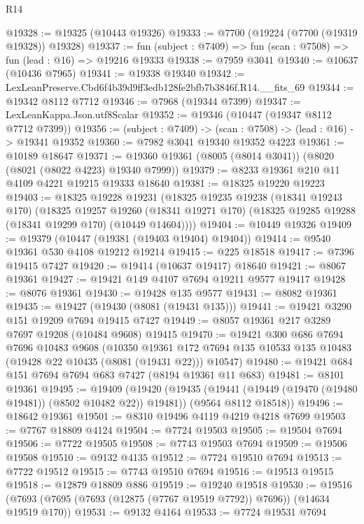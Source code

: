 \begin{lexlean}{R14}
\begin{coremodule}
@19328 := @19325 (@10443 @19326)
@19333 := @7700 (@19224 (@7700 (@19319 @19328)) @19328)
@19337 := fun (subject : @7409) => fun (scan : @7508) => fun (lead : @16) => @19216 @19333
@19338 := @7959 @3041
@19340 := @10637 (@10436 @7965)
@19341 := @19338 @19340
@19342 := LexLeanPreserve.Cbd6f4b39d9ff3edb128fe2bfb7b3846f.R14.__fits_69
@19344 := @19342 @8112 @7712
@19346 := @7968 (@19344 @7399)
@19347 := LexLeanKappa.Json.utf8Scalar
@19352 := @19346 (@10447 (@19347 @8112 @7712 @7399))
@19356 := (subject : @7409) -> (scan : @7508) -> (lead : @16) -> @19341 @19352
@19360 := @7982 @3041 @19340 @19352 @4223
@19361 := @10189 @18647
@19371 := @19360 @19361 (@8005 (@8014 @3041)) (@8020 (@8021 (@8022 @4223) @19340 @7999))
@19379 := @8233 @19361 @210 @11 @4109 @4221 @19215 @19333 @18640
@19381 := @18325 @19220 @19223
@19403 := @18325
    @19228
    @19231
    (@18325
      @19235
      @19238
      (@18341 @19243 @170)
      (@18325
        @19257
        @19260
        (@18341 @19271 @170)
        (@18325 @19285 @19288 (@18341 @19299 @170) (@10449 @14604))))
@19404 := @10449 @19326
@19409 := @19379 (@10447 (@19381 (@19403 @19404) @19404))
@19414 := @9540 @19361 @530 @4108 @19212 @19214
@19415 := @225 @18518
@19417 := @7396 @19415 @7427
@19420 := @19414 (@10637 @19417) @18640
@19421 := @8067 @19361
@19427 := @19421 @149 @4107 @7694 @19211 @9577 @19417
@19428 := @8076 @19361
@19430 := @19428 @135 @9577
@19431 := @8082 @19361
@19435 := @19427 (@19430 (@8081 (@19431 @135)))
@19441 := @19421 @3290 @151 @19209 @7694 @19415 @7427
@19449 := @8057 @19361 @217 @3289 @7697 @19208 (@10484 @9608) @19415
@19470 := @19421
    @300
    @686
    @7694
    @7696
    @10483
    @9608
    (@10350
      @19361
      @172
      @7694
      @135
      @10533
      @135
      @10483
      (@19428 @22 @10435 (@8081 (@19431 @22)))
      @10547)
@19480 := @19421 @684 @151 @7694 @7694 @683 @7427 (@8194 @19361 @11 @683)
@19481 := @8101 @19361
@19495 := @19409
    (@19420
      (@19435 (@19441 (@19449 (@19470 (@19480 @19481)) (@8502 @10482 @22)) @19481))
      (@9564 @8112 @18518))
@19496 := @18642 @19361
@19501 := @8310 @19496 @4119 @4219 @4218 @7699
@19503 := @7767 @18809 @4124
@19504 := @7724 @19503
@19505 := @19504 @7694
@19506 := @7722 @19505
@19508 := @7743 @19503 @7694
@19509 := @19506 @19508
@19510 := @9132 @4135
@19512 := @7724 @19510 @7694
@19513 := @7722 @19512
@19515 := @7743 @19510 @7694
@19516 := @19513 @19515
@19518 := @12879 @18809 @886
@19519 := @19240 @19518
@19530 := @19516 (@7693 (@7695 (@7693 (@12875 (@7767 @19519 @7792)) @7696)) (@14634 @19519 @170))
@19531 := @9132 @4164
@19533 := @7724 @19531 @7694

\end{coremodule}
\end{lexlean}
